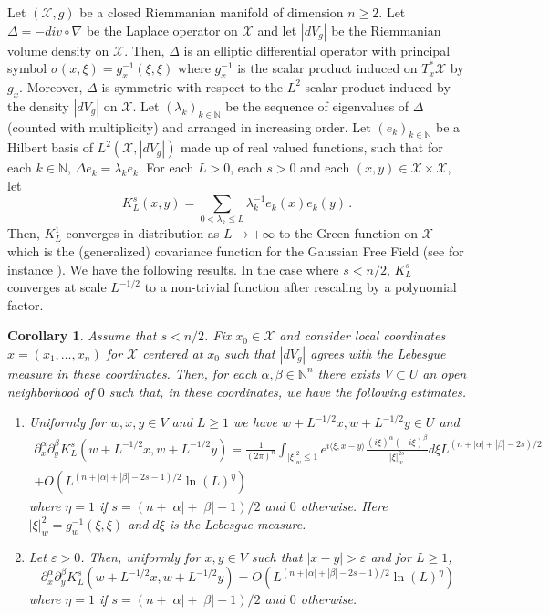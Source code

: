 \documentclass[10pt,twoside]{article}
\newcommand{\eps}{\varepsilon}
\newcommand{\N}{\mathbb{N}}
\newcommand{\man}{\mathcal{X}}
\numberwithin{theorem}{section}
\newtheorem{corollary}[theorem]{Corollary}
\begin{document}
Let $(\man,g)$ be a closed Riemmanian manifold of dimension $n\geq 2$. Let $\Delta=-div\circ\nabla$ be the Laplace operator on $\man$ and let $|dV_g|$ be the Riemmanian volume density on $\man$. Then, $\Delta$ is an elliptic differential operator with principal symbol $\sigma(x,\xi)=g_x^{-1}\left(\xi,\xi\right)$ where $g^{-1}_x$ is the scalar product induced on $T^*_x\man$ by $g_x$. Moreover, $\Delta$ is symmetric with respect to the $L^2$-scalar product induced by the density $|dV_g|$ on $\man$. Let $\left(\lambda_k\right)_{k\in\N}$ be the sequence of eigenvalues of $\Delta$ (counted with multiplicity) and arranged in increasing order. Let $\left(e_k\right)_{k\in\N}$ be a Hilbert basis of $L^2\left(\man,|dV_g|\right)$ made up of real valued functions, such that for each $k\in\N$, $\Delta e_k=\lambda_k e_k$. For each $L>0$, each $s>0$ and each $(x,y)\in\man\times\man$, let
\[
K^s_L(x,y)=\sum_{0<\lambda_k\leq L}\lambda_k^{-1}e_k(x)e_k(y)\, .
\]
Then, $K^1_L$ converges in distribution as $L\rightarrow+\infty$ to the Green function on $\man$ which is the (generalized) covariance function for the Gaussian Free Field (see for instance \cite{shef_gff}). We have the following results. In the case where $s<n/2$, $K^s_L$ converges at scale $L^{-1/2}$ to a non-trivial function after rescaling by a polynomial factor.
\begin{corollary}\label{c.gff.1}
Assume that $s<n/2$. Fix $x_0\in\man$ and consider local coordinates $x=(x_1,\dots,x_n)$ for $\man$ centered at $x_0$ such that $|dV_g|$ agrees with the Lebesgue measure in these coordinates. Then, for each $\alpha,\beta\in\N^n$ there exists $V\subset U$ an open neighborhood of $0$ such that, in these coordinates, we have the following estimates.
\begin{enumerate}
\item Uniformly for $w,x,y\in V$ and $L\geq 1$ we have $w+L^{-1/2}x,w+L^{-1/2}y\in U$ and
\begin{multline*}
\partial_x^\alpha\partial_y^\beta K^s_L\left(w+L^{-1/2}x,w+L^{-1/2}y\right)=\frac{1}{(2\pi)^n}\int_{|\xi|_w^2\leq 1}e^{i\langle\xi,x-y\rangle}\frac{(i\xi)^\alpha(-i\xi)^\beta}{|\xi|_w^{2s}} d\xi L^{(n+|\alpha|+|\beta|-2s)/2}\\
+O\left(L^{(n+|\alpha|+|\beta|-2s-1)/2}\ln\left(L\right)^\eta\right)
\end{multline*}
where $\eta=1$ if $s=(n+|\alpha|+|\beta|-1)/2$ and $0$ otherwise. Here $|\xi|_w^2=g^{-1}_w(\xi,\xi)$ and $d\xi$ is the Lebesgue measure.
\item Let $\eps>0$. Then, uniformly for $x,y\in V$ such that $|x-y|>\eps$ and for $L\geq 1$,
\[
\partial_x^\alpha\partial_y^\beta K^s_L\left(w+L^{-1/2}x,w+L^{-1/2}y\right)=O\left(L^{(n+|\alpha|+|\beta|-2s-1)/2}\ln\left(L\right)^\eta\right)
\]
where $\eta=1$ if $s=(n+|\alpha|+|\beta|-1)/2$ and $0$ otherwise.
\end{enumerate}
\end{corollary}
\end{document}

